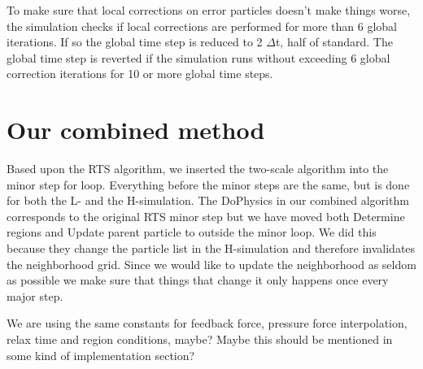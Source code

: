 \documentclass[../../main.tex]{subfiles}
\begin{document}
To make sure that local corrections on error particles doesn't make things worse, the simulation checks if local corrections are performed for more than 6 global iterations. If so the global time step is reduced to 2 $\Delta$t, half of standard. The global time step is reverted if the simulation runs without exceeding 6 global correction iterations for 10 or more global time steps. 



\section{Our combined method}

Based upon the RTS algorithm, we inserted the two-scale algorithm into the minor step for loop. Everything before the minor steps are the same, but is done for both the L- and the H-simulation. The DoPhysics in our combined algorithm corresponds to the original RTS minor step but we have moved both Determine regions and Update parent particle to outside the minor loop. We did this because they change the particle list in the H-simulation and therefore invalidates the neighborhood grid. Since we would like to update the neighborhood as seldom as possible we make sure that things that change it only happens once every major step. 

We are using the same constants for feedback force, pressure force interpolation, relax time and region conditions, maybe? Maybe this should be mentioned in some kind of implementation section?
\end{document}
